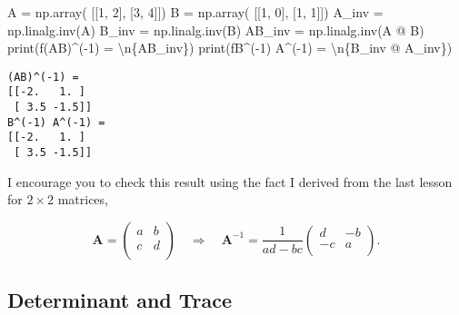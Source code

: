 \documentclass[
  letterpaper,
  DIV=11,
  numbers=noendperiod]{scrreprt}
\newenvironment{Shaded}{\begin{snugshade}}{\end{snugshade}}
\newcommand{\BuiltInTok}[1]{\textcolor[rgb]{0.00,0.23,0.31}{#1}}
\newcommand{\CharTok}[1]{\textcolor[rgb]{0.13,0.47,0.30}{#1}}
\newcommand{\DecValTok}[1]{\textcolor[rgb]{0.68,0.00,0.00}{#1}}
\newcommand{\NormalTok}[1]{\textcolor[rgb]{0.00,0.23,0.31}{#1}}
\newcommand{\OperatorTok}[1]{\textcolor[rgb]{0.37,0.37,0.37}{#1}}
\newcommand{\SpecialCharTok}[1]{\textcolor[rgb]{0.37,0.37,0.37}{#1}}
\newcommand{\SpecialStringTok}[1]{\textcolor[rgb]{0.13,0.47,0.30}{#1}}
\begin{document}
\begin{Shaded}
\begin{Highlighting}[]
\NormalTok{A }\OperatorTok{=}\NormalTok{ np.array(}
\NormalTok{    [[}\DecValTok{1}\NormalTok{, }\DecValTok{2}\NormalTok{], }
\NormalTok{     [}\DecValTok{3}\NormalTok{, }\DecValTok{4}\NormalTok{]])}
\NormalTok{B }\OperatorTok{=}\NormalTok{ np.array(}
\NormalTok{    [[}\DecValTok{1}\NormalTok{, }\DecValTok{0}\NormalTok{], }
\NormalTok{     [}\DecValTok{1}\NormalTok{, }\DecValTok{1}\NormalTok{]])}
\NormalTok{A\_inv }\OperatorTok{=}\NormalTok{ np.linalg.inv(A)}
\NormalTok{B\_inv }\OperatorTok{=}\NormalTok{ np.linalg.inv(B)}
\NormalTok{AB\_inv }\OperatorTok{=}\NormalTok{ np.linalg.inv(A }\OperatorTok{@}\NormalTok{ B)}
\BuiltInTok{print}\NormalTok{(}\SpecialStringTok{f\textquotesingle{}(AB)\^{}({-}1) = }\CharTok{\textbackslash{}n}\SpecialCharTok{\{}\NormalTok{AB\_inv}\SpecialCharTok{\}}\SpecialStringTok{\textquotesingle{}}\NormalTok{)}
\BuiltInTok{print}\NormalTok{(}\SpecialStringTok{f\textquotesingle{}B\^{}({-}1) A\^{}({-}1) = }\CharTok{\textbackslash{}n}\SpecialCharTok{\{}\NormalTok{B\_inv }\OperatorTok{@}\NormalTok{ A\_inv}\SpecialCharTok{\}}\SpecialStringTok{\textquotesingle{}}\NormalTok{)}
\end{Highlighting}
\end{Shaded}

\begin{verbatim}
(AB)^(-1) = 
[[-2.   1. ]
 [ 3.5 -1.5]]
B^(-1) A^(-1) = 
[[-2.   1. ]
 [ 3.5 -1.5]]
\end{verbatim}

I encourage you to check this result using the fact I derived from the
last lesson for \(2 \times 2\) matrices,

\[
\mathbf{A} = 
\begin{pmatrix}
a & b \\
c & d \\
\end{pmatrix} \quad \Longrightarrow \quad
\mathbf{A}^{-1} = \frac{1}{ad-bc}
\begin{pmatrix}
d & -b \\
-c & a \\
\end{pmatrix}.
\]

\hypertarget{determinant-and-trace}{%
\subsection{Determinant and Trace}\label{determinant-and-trace}}
\end{document}
